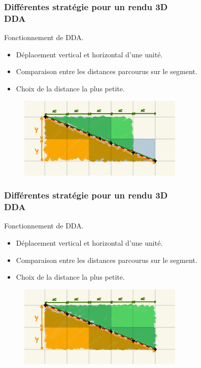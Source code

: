 \documentclass{beamer}
\begin{document}
\begin{frame}
    \frametitle{Différentes stratégie pour un rendu 3D \\
                \small DDA}           
    \begin{block}{Fonctionnement de DDA.}
        \begin{itemize}
            \item Déplacement vertical et horizontal d'une unité.
            \item Comparaison entre les distances parcourus sur le segment.
            \item Choix de la distance la plus petite.
        \end{itemize}
    \end{block}    
    \begin{figure}
        \centering
        \includegraphics[width=0.7\textwidth]{images/DDA 5.jpg}
    \end{figure}
\end{frame}

\begin{frame}
    \frametitle{Différentes stratégie pour un rendu 3D \\
                \small DDA}           
    \begin{block}{Fonctionnement de DDA.}
        \begin{itemize}
            \item Déplacement vertical et horizontal d'une unité.
            \item Comparaison entre les distances parcourus sur le segment.
            \item Choix de la distance la plus petite.
        \end{itemize}
    \end{block}    
    \begin{figure}
        \centering
        \includegraphics[width=0.7\textwidth]{images/DDA 6.jpg}
    \end{figure}
\end{frame}
\end{document}
